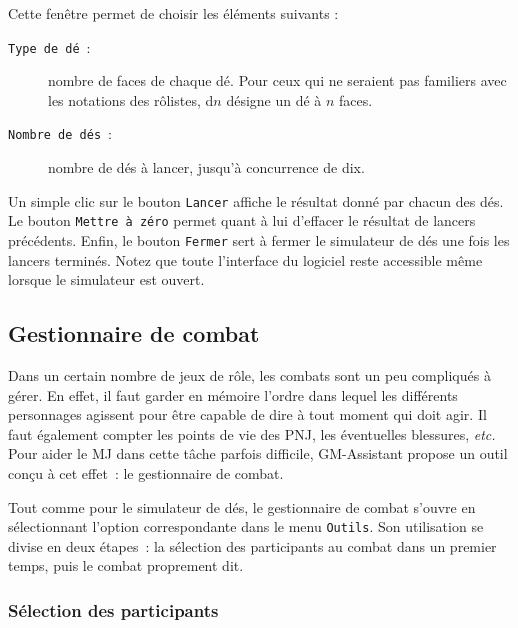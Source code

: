 \documentclass[a4paper,12pt]{article}
\newcommand*{\GMA}{GM-Assistant\xspace}
\newcommand*{\interfaceitem}[1]{\texttt{#1}}
\begin{document}
Cette fenêtre permet de choisir les éléments suivants :
\begin{description}
    \item[\interfaceitem{Type de dé}~:]{nombre de faces de chaque dé. Pour ceux qui ne seraient pas familiers avec les notations des rôlistes, d$n$ désigne un dé à $n$ faces.}
    \item[\interfaceitem{Nombre de dés}~:]{nombre de dés à lancer, jusqu'à concurrence de dix.}
\end{description}
Un simple clic sur le bouton \interfaceitem{Lancer} affiche le résultat donné par chacun des dés.
Le bouton \interfaceitem{Mettre à zéro} permet quant à lui d'effacer le résultat de lancers précédents.
Enfin, le bouton \interfaceitem{Fermer} sert à fermer le simulateur de dés une fois les lancers terminés.
Notez que toute l'interface du logiciel reste accessible même lorsque le simulateur est ouvert.

\subsection{Gestionnaire de combat}
\label{sec:combat}

Dans un certain nombre de jeux de rôle, les combats sont un peu compliqués à gérer.
En effet, il faut garder en mémoire l'ordre dans lequel les différents personnages agissent pour être capable de dire à tout moment qui doit agir.
Il faut également compter les points de vie des PNJ, les éventuelles blessures, \emph{etc.}
Pour aider le MJ dans cette tâche parfois difficile, \GMA propose un outil conçu à cet effet~: le gestionnaire de combat.

Tout comme pour le simulateur de dés, le gestionnaire de combat s'ouvre en sélectionnant l'option correspondante dans le menu \interfaceitem{Outils}.
Son utilisation se divise en deux étapes~: la sélection des participants au combat dans un premier temps, puis le combat proprement dit.

\subsubsection{Sélection des participants}
\end{document}
